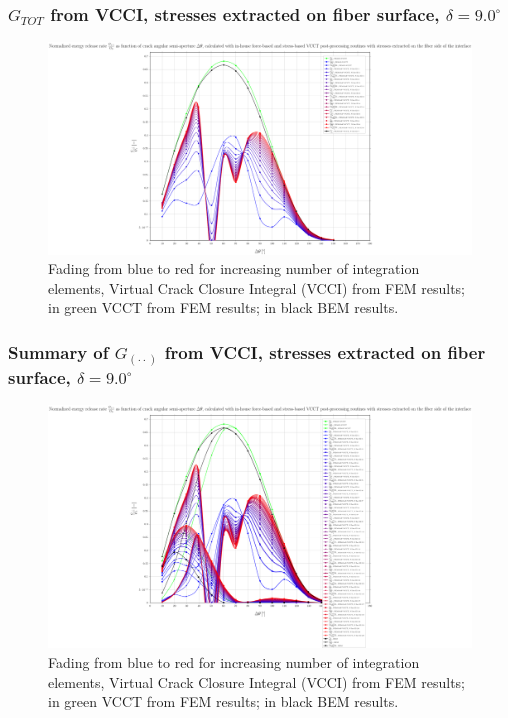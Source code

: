 \begin{frame}
\frametitle{\small $G_{TOT}$ from VCCI, stresses extracted on fiber surface, $\delta=9.0^{\circ}$}
\vspace{-0.75cm}
\centering
\captionsetup[figure]{font=scriptsize,labelfont=scriptsize}
\begin{figure}[!h]
\centering
\includegraphics[height=0.7\textheight]{2017-07-25_AbqRunSummary_SmallStrain_D09/pdf/2017-07-25_AbqRunSummary_SmallStrain_D09_F-SoF-VCCT_GTOT.pdf}
  \caption{\scriptsize Fading from blue to red for increasing number of integration elements, Virtual Crack Closure Integral (VCCI) from FEM results; in green VCCT from FEM results; in black BEM results.}
  \label{fig:res1}
\end{figure}
\end{frame}
\begin{frame}
\frametitle{\small Summary of $G_{\left(\cdot\cdot\right)}$ from VCCI, stresses extracted on fiber surface, $\delta=9.0^{\circ}$}
\vspace{-0.75cm}
\centering
\captionsetup[figure]{font=scriptsize,labelfont=scriptsize}
\begin{figure}[!h]
\centering
\includegraphics[height=0.7\textheight]{2017-07-25_AbqRunSummary_SmallStrain_D09/pdf/2017-07-25_AbqRunSummary_SmallStrain_D09_F-SoF-VCCT_Summary.pdf}
  \caption{\scriptsize Fading from blue to red for increasing number of integration elements, Virtual Crack Closure Integral (VCCI) from FEM results; in green VCCT from FEM results; in black BEM results.}
  \label{fig:res1}
\end{figure}
\end{frame}
